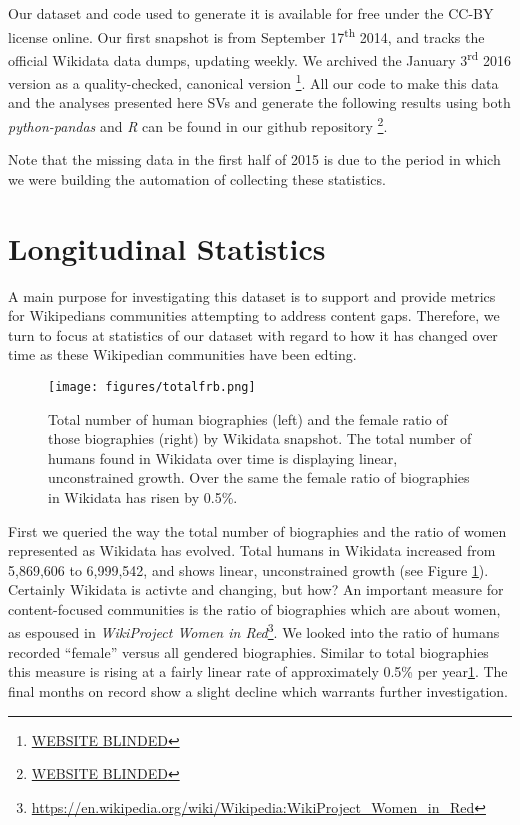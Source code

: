 \documentclass{sig-alternate-05-2015}
\begin{document}
Our dataset and code used to generate it is available for free under the CC-BY license online. Our first snapshot is from September 17\textsuperscript{th} 2014, and tracks the official  Wikidata data dumps, updating weekly. We archived the January 3\textsuperscript{rd} 2016 version as a quality-checked, canonical version \footnote{\url{WEBSITE BLINDED}}. All our code to make this data and the analyses presented here SVs and generate the following results using both \textit{python-pandas} and \textit{R} can be found in our github repository \footnote{\url{WEBSITE BLINDED}}.

Note that the missing data in the first half of 2015 is due to the period in which we were building the automation of collecting these statistics.


\section{Longitudinal Statistics}

A main purpose for investigating this dataset is to support and provide metrics for Wikipedians communities attempting to  address content gaps. Therefore, we turn to focus at statistics of our dataset with regard to how it has changed over time as these Wikipedian communities have been edting.

\begin{figure}
\texttt{[image: figures/totalfrb.png]}
\caption{Total number of human biographies (left) and the female ratio of those biographies (right) by Wikidata snapshot. The total number of humans found in Wikidata over time is displaying linear, unconstrained growth. Over the same  the female ratio of biographies in Wikidata has risen by 0.5\%.}
\label{fig:totalfrb}
\end{figure}

First we queried the way the total number of biographies and the ratio of women represented as Wikidata has evolved. Total humans in Wikidata increased from 5,869,606 to 6,999,542, and shows linear, unconstrained growth (see Figure \ref{fig:totalfrb}). Certainly Wikidata is activte and changing, but how? An important measure for content-focused communities is the ratio of biographies which are about women, as espoused in \textit{WikiProject Women in Red}\footnote{\url{https://en.wikipedia.org/wiki/Wikipedia:WikiProject_Women_in_Red}}. We looked into the ratio of  humans recorded ``female'' versus all gendered biographies. Similar to total biographies this measure is rising at a fairly linear rate of approximately 0.5\% per year\ref{fig:totalfrb}. The final months on record show a slight decline which warrants further investigation.
\end{document}
